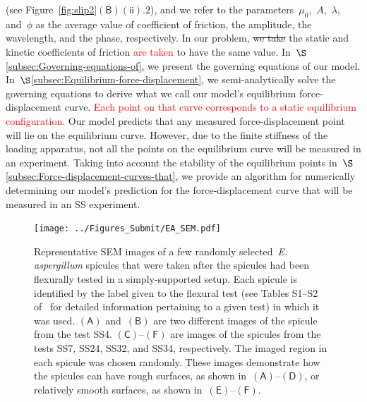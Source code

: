 \documentclass[preprint,10pt,times]{elsarticle}
\numberwithin{equation}{section}
\newcommand{\pr}[1]{\left( #1 \right)}
\newcommand{\subf}[1]{\pr{\textsf{#1}}}
\begin{document}
(see Figure~\ref{fig:slip2}$\subf{B}$$\subf{ii}.2$), and we refer
to the parameters~$\mu_0$,~$A$,~$\lambda$, and~$\phi$ as the
average value of coefficient of friction, the amplitude, the wavelength,
and the phase, respectively. In our problem, \sout{we take} the static and
kinetic coefficients of friction \textcolor{red}{are taken} to have the same value. In~$\S$\ref{subsec:Governing-equations-of},
we present the governing equations of our model. In~$\S$\ref{subsec:Equilibrium-force-displacement},
we semi-analytically solve the governing equations to derive what
we call our model's equilibrium force-displacement curve. \textcolor{red}{Each point on that curve corresponds to a static equilibrium configuration.}
Our model
predicts that any measured force-displacement point will lie on the
equilibrium curve. However, due to the finite stiffness of the loading
apparatus, not all the points on the equilibrium curve will be measured
in an experiment. Taking into account the stability of the equilibrium
points in~$\S$\textcolor{violet}{\ref{subsec:Force-displacement-curves-that}},
we provide an algorithm for numerically determining our model's prediction
for the force-displacement curve that will be measured in an SS experiment.

\begin{figure}
\begin{centering}
\texttt{[image: ../Figures\_Submit/EA\_SEM.pdf]}
\par\end{centering}
\caption{
\label{fig:SEM}
Representative SEM images of a few
randomly selected~\textit{E. aspergillum} spicules that were taken after the spicules had been flexurally tested in a simply-supported setup. %
Each spicule is identified by the label given to the
flexural test (see Tables S1--S2 of~\cite{Sayaka2021Sawtooth} for detailed
information pertaining to a given test) in which it was used. %
$\subf{A}$ and~$\subf{B}$ are two
different images of the spicule from the test SS4. %
$\subf{C}$--$\subf{F}$ are images of
the spicules from the tests  SS7,
SS24, SS32, and SS34, respectively. %
The imaged region in each spicule was chosen randomly. %
These images demonstrate how the spicules can have rough
surfaces, as shown in~$\subf{A}$--$\subf{D}$, or relatively smooth
surfaces, as shown in~$\subf{E}$--$\subf{F}$. %
}
\end{figure}
\end{document}
